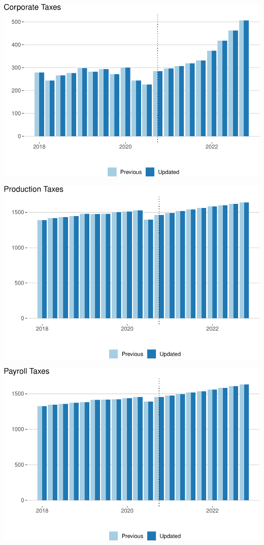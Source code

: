 \documentclass[
]{article}
\begin{document}
\begin{center}\includegraphics{update-changes-levels_files/figure-latex/corporate-tax-1} \end{center}

\begin{center}\includegraphics{update-changes-levels_files/figure-latex/production-taxes-1} \end{center}

\begin{center}\includegraphics{update-changes-levels_files/figure-latex/payroll-taxes-1} \end{center}
\end{document}
